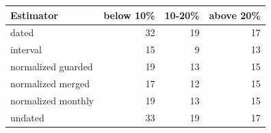 \begin{tabular}{lrrr}
\hline
Estimator & below 10\% & 10-20\% & above 20\% \\
\hline
dated & 32 & 19 & 17 \\
interval & 15 & 9 & 13 \\
normalized guarded & 19 & 13 & 15 \\
normalized merged & 17 & 12 & 15 \\
normalized monthly & 19 & 13 & 15 \\
undated & 33 & 19 & 17 \\
\hline
\end{tabular}
